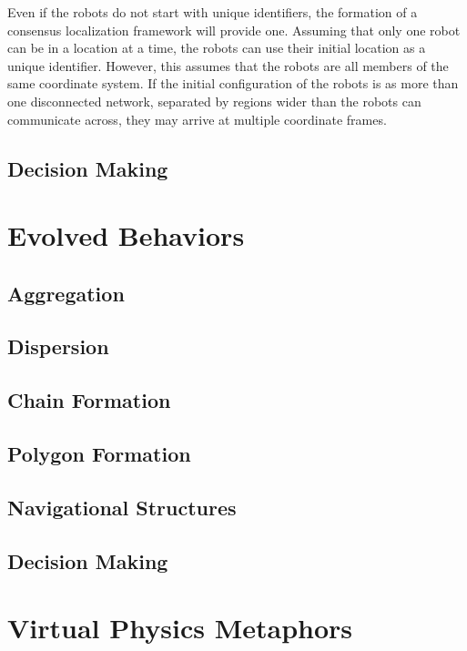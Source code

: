 \documentclass[]{article}
\begin{document}
Even if the robots do not start with unique identifiers, the formation of a consensus localization framework will provide one.
Assuming that only one robot can be in a location at a time, the robots can use their initial location as a unique identifier. 
However, this assumes that the robots are all members of the same coordinate system.
If the initial configuration of the robots is as more than one disconnected network, separated by regions wider than the robots can communicate across, they may arrive at multiple coordinate frames.


\subsection{Decision Making}

\section{Evolved Behaviors}

\subsection{Aggregation}

\subsection{Dispersion}

\subsection{Chain Formation}

\subsection{Polygon Formation}

\subsection{Navigational Structures}

\subsection{Decision Making}

\section{Virtual Physics Metaphors}
\end{document}
